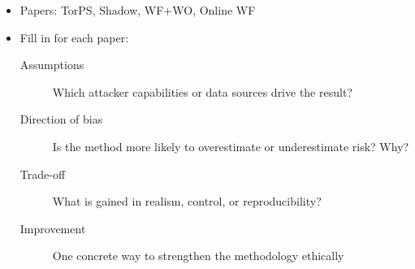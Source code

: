 \begin{frame}
  \begin{activity}
  \begin{itemize}
    \item Papers: TorPS, Shadow, WF+WO, Online WF
    \item Fill in for each paper:
      \begin{description}
        \item[Assumptions] Which attacker capabilities or data sources drive 
          the result?
        \item[Direction of bias] Is the method more likely to overestimate or 
          underestimate risk? Why?
        \item[Trade-off] What is gained in realism, control, or 
          reproducibility?
        \item[Improvement] One concrete way to strengthen the methodology 
          ethically
      \end{description}
  \end{itemize}
  \end{activity}
\end{frame}


